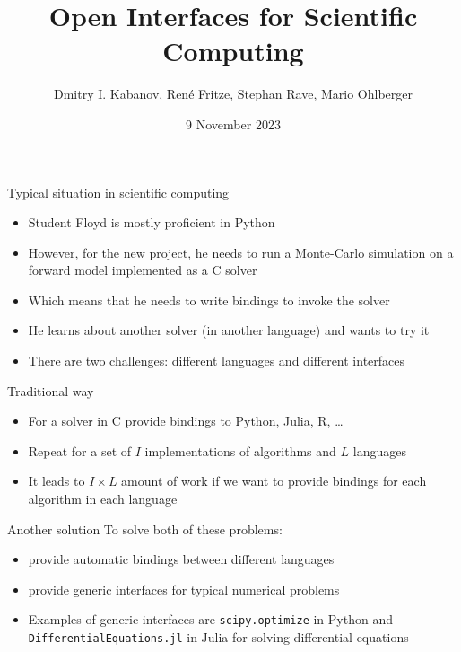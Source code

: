 \documentclass[10pt, aspectratio=169, progressbar=frametitle]{beamer}
\title{Open Interfaces for Scientific Computing}
\author{Dmitry I. Kabanov, Ren\'e Fritze, Stephan Rave, Mario Ohlberger}
\institute{University of Münster}
\date{9 November 2023}
\begin{document}
\maketitle

\begin{frame}{Typical situation in scientific computing}
  \begin{itemize}
    \item Student Floyd is mostly proficient in Python
    \item However, for the new project, he needs to run a Monte-Carlo
          simulation on a forward model implemented as a C solver
    \item Which means that he needs to write bindings to invoke the solver
    \item He learns about another solver (in another language) and wants to try it
    \item There are \alert{two challenges:} different languages and different interfaces
  \end{itemize}
\end{frame}

\begin{frame}{Traditional way}
  \begin{minipage}{0.45\textwidth}
    \begin{itemize}
      \item For a solver in C provide bindings to Python, Julia, R, \dots
      \item Repeat for a set of $I$ implementations of algorithms and $L$ languages
      \item It leads to $I \times L$ amount of work if we want to provide
            bindings for each algorithm in each language
    \end{itemize}
  \end{minipage}\hfill
  \begin{minipage}{0.45\textwidth}
    
  \end{minipage}
\end{frame}

\begin{frame}{Another solution}
  To solve both of these problems:
  \begin{itemize}
    \item provide automatic bindings between different languages
    \item provide generic interfaces for typical numerical problems
    \item Examples of generic interfaces are \texttt{scipy.optimize} in Python
          and \texttt{DifferentialEquations.jl} in Julia
          for solving differential equations
  \end{itemize}
\end{frame}
\end{document}
